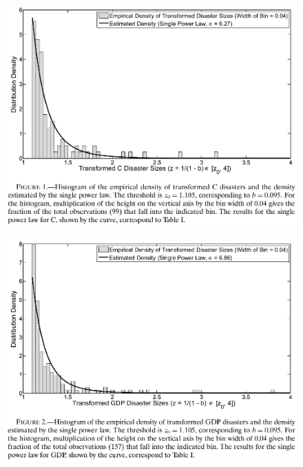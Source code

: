 \documentclass{beamer}
\begin{document}
\begin{frame}
  \begin{figure}
    \includegraphics{barro_jin1.eps}
  \end{figure}
\end{frame}

\begin{frame}
  \begin{figure}
    \includegraphics{barro_jin2.eps}
  \end{figure}
\end{frame}
\end{document}
